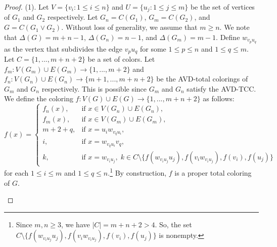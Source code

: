 \documentclass[12pt,reqno,a4paper]{amsart}
\theoremstyle{definition}
\theoremstyle{plain}
\begin{document}
\begin{proof}
(1). Let $V=\{v_{i}: 1 \leq i \leq n\}$ and $U=\{u_{j} : 1 \leq j \leq m\}$ be the set of vertices of $G_{1}$ and $G_{2}$ respectively. 
Let $G_{n}=C(G_{1})$, $G_{m}=C(G_{2})$, and $G=C(G_{1} \vee G_{2})$. 
Without loss of generality, we assume that $m\geq n$. We note that $\Delta(G)=m+n-1$, $\Delta(G_{n})=n-1$, and $\Delta(G_{m})=m-1$. 
Define $w_{v_{p}u_{q}}$ as the vertex that subdivides the edge $v_{p}u_{q}$ for some $1\leq p\leq n$ and $1\leq q\leq m$. 
Let $C=\{1,...,m+n+2\}$ be a set of colors.
Let $f_{m}: V(G_{m})\cup E(G_{m})\rightarrow \{1,...,m+2\}$ and $f_{n}: V(G_{n})\cup E(G_{n})\rightarrow \{m+1,...,m+n+2\}$ be the AVD-total colorings of $G_{m}$ and $G_{n}$ respectively. This is possible since $G_{m}$ and $G_{n}$ satisfy the AVD-TCC.
We define the coloring $f: V(G)\cup E(G) \rightarrow \{1,...,m+n+2\}$ as follows:
\[
f(x)=
\begin{cases}
f_n(x), & \text{if } x\in V(G_n)\cup E(G_n),\\
f_m(x), & \text{if } x\in V(G_m)\cup E(G_m),\\
m+2+q, & \text{if } x=u_iw_{v_qu_i},\\
i, & \text{if } x=w_{v_qu_i}v_q,\\
k, & \text{if } x=w_{v_i u_j},\;
k\in C\setminus\{f(w_{v_i u_j}u_j),f(v_iw_{v_i u_j}),f(v_i),f(u_j)\}
\end{cases}
\]
for each $1\leq i\leq m$ and $1\leq q\leq n$.\footnote{Since $m,n \ge 3$, we have $|C| = m+n+2 > 4$. So, the set 
$C \setminus \{f(w_{v_i u_j}u_j), f(v_i w_{v_i u_j}), f(v_i), f(u_j)\}$ 
is nonempty.} By construction, $f$ is a proper total coloring of $G$. 


\begin{figure}[h]
\centering
{}
\end{figure}
\end{proof}
\end{document}
